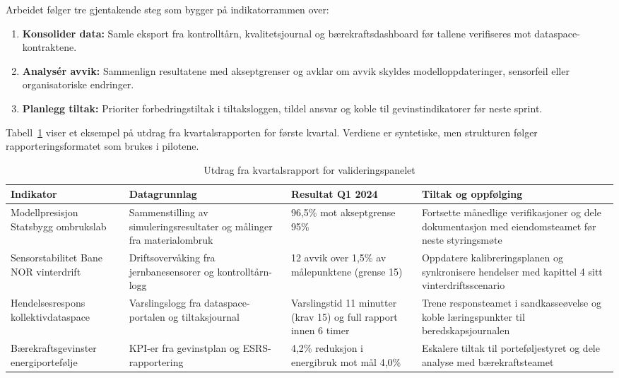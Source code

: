 Arbeidet følger tre gjentakende steg som bygger på indikatorrammen over:
\begin{enumerate}
    \item \textbf{Konsolider data:} Samle eksport fra kontrolltårn, kvalitetsjournal og bærekraftsdashboard før tallene verifiseres mot dataspace-kontraktene.
    \item \textbf{Analysér avvik:} Sammenlign resultatene med akseptgrenser og avklar om avvik skyldes modelloppdateringer, sensorfeil eller organisatoriske endringer.
    \item \textbf{Planlegg tiltak:} Prioriter forbedringstiltak i tiltaksloggen, tildel ansvar og koble til gevinstindikatorer før neste sprint.
\end{enumerate}

Tabell~\ref{tab:kvartalsrapport} viser et eksempel på utdrag fra kvartalsrapporten for første kvartal. Verdiene er syntetiske, men strukturen følger rapporteringsformatet som brukes i pilotene.

\begin{table}[ht]
    \centering
    \caption{Utdrag fra kvartalsrapport for valideringspanelet}
    \label{tab:kvartalsrapport}
    \begin{tabular}{|p{3.2cm}|p{4.4cm}|p{3.2cm}|p{4.2cm}|}
        \hline
        \textbf{Indikator} & \textbf{Datagrunnlag} & \textbf{Resultat Q1 2024} & \textbf{Tiltak og oppfølging} \\
        \hline
        Modellpresisjon Statsbygg ombrukslab & Sammenstilling av simuleringsresultater og målinger fra materialombruk & 96,5\% mot akseptgrense 95\% & Fortsette månedlige verifikasjoner og dele dokumentasjon med eiendomsteamet før neste styringsmøte \citep{statsbygg2022ombruk,statsbygg2023digitalmodenhet} \\
        \hline
        Sensorstabilitet Bane NOR vinterdrift & Driftsovervåking fra jernbanesensorer og kontrolltårn-logg & 12 avvik over 1,5\% av målepunktene (grense 15) & Oppdatere kalibreringsplanen og synkronisere hendelser med kapittel 4 sitt vinterdriftsscenario \citep{banenor2023vinterdrift,banenor2024leverandor} \\
        \hline
        Hendelsesrespons kollektivdataspace & Varslingslogg fra dataspace-portalen og tiltaksjournal & Varslingstid 11 minutter (krav \leq{}15) og full rapport innen 6 timer & Trene responsteamet i sandkasseøvelse og koble læringspunkter til beredskapsjournalen \citep{ruter2023dataplattform,ruter2024mobilitetslab} \\
        \hline
        Bærekraftsgevinster energiportefølje & KPI-er fra gevinstplan og ESRS-rapportering & 4,2\% reduksjon i energibruk mot mål 4,0\% & Eskalere tiltak til porteføljestyret og dele analyse med bærekraftsteamet \citep{efrag2023esrs,dfo2023baerekraft} \\
        \hline
    \end{tabular}
\end{table}

